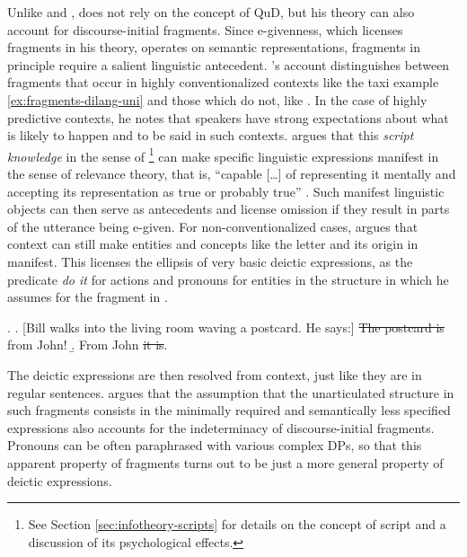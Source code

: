 Unlike \citet{reich2007} and \citet{weir2014}, \citet{merchant2004} does not rely on the concept of QuD, but his theory can also account for discourse-initial fragments. Since e-givenness, which licenses fragments in his theory, operates on semantic representations, fragments in principle require a salient linguistic antecedent. \citeauthor{merchant2004}'s account distinguishes between fragments that occur in highly conventionalized contexts like the taxi example \ref{ex:fragments-dilang-uni} and those which do not, like \Next[a]. In the case of highly predictive contexts, he notes that speakers have strong expectations about what is likely to happen and to be said in such contexts. \citet[730-731]{merchant2004} argues that this \textit{script knowledge} in the sense of \citet{schank.abelson1977}%
%
\footnote{See Section \ref{sec:infotheory-scripts} for details on the concept of script and a discussion of its psychological effects.}\afterfn%
% 
can make specific linguistic expressions manifest in the sense of relevance theory, that is, ``capable [\dots] of representing it mentally and accepting its representation as true or probably true'' \citep[39]{sperber.wilson1986}. Such manifest linguistic objects can then serve as antecedents and license omission if they result in parts of the utterance being e-given. For non-conventionalized cases, \citet[722-727]{merchant2004} argues that context can still make entities and concepts like the letter and its origin in \Next[a] manifest. This licenses the ellipsis of very basic deictic expressions, as the predicate \textit{do it} for actions and pronouns for entities in the structure in \Next[b] which he assumes for the fragment in \Last. 

\ex. \a. [Bill walks into the living room waving a postcard. He says:]
	   \sout{The postcard is} from John!
\b. From John \sout{it is}.

The deictic expressions are then resolved from context, just like they are in regular sentences. \citet[722]{merchant2004} argues that the assumption that the unarticulated structure in such fragments consists in the minimally required and semantically less specified expressions also accounts for the indeterminacy of discourse-initial fragments. Pronouns can be often paraphrased with various complex DPs, so that this apparent property of fragments turns out to be just a more general property of deictic expressions. 

